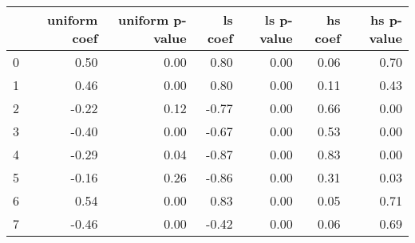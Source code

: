 \begin{tabular}{lrrrrrr}
\toprule
 & uniform coef & uniform p-value & ls coef & ls p-value & hs coef & hs p-value \\
\midrule
0 & 0.50 & 0.00 & 0.80 & 0.00 & 0.06 & 0.70 \\
1 & 0.46 & 0.00 & 0.80 & 0.00 & 0.11 & 0.43 \\
2 & -0.22 & 0.12 & -0.77 & 0.00 & 0.66 & 0.00 \\
3 & -0.40 & 0.00 & -0.67 & 0.00 & 0.53 & 0.00 \\
4 & -0.29 & 0.04 & -0.87 & 0.00 & 0.83 & 0.00 \\
5 & -0.16 & 0.26 & -0.86 & 0.00 & 0.31 & 0.03 \\
6 & 0.54 & 0.00 & 0.83 & 0.00 & 0.05 & 0.71 \\
7 & -0.46 & 0.00 & -0.42 & 0.00 & 0.06 & 0.69 \\
\bottomrule
\end{tabular}
